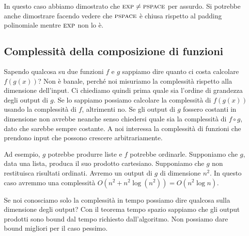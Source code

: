 In questo caso abbiamo dimostrato che $\textsc{exp} \not= \textsc{pspace}$ per assurdo. Si potrebbe anche dimostrare
facendo vedere che $\textsc{pspace}$ è chiusa rispetto al padding polinomiale mentre $\textsc{exp}$ non lo è.

\subsection{Complessità della composizione di funzioni}

Sapendo qualcosa su due funzioni $f$ e $g$ sappiamo dire quanto ci costa calcolare $f(g(x))$? Non è
banale, perché noi misuriamo la complessità rispetto alla dimensione dell'input. Ci chiediamo quindi
prima quale sia l'ordine di grandezza degli output di $g$. Se lo sappiamo possiamo calcolare la
complessità di $f(g(x))$ usando la complessità di $f$, altrimenti no. Se gli output di $g$ fossero
costanti in dimensione non avrebbe neanche senso chiedersi quale sia la complessità di $f \circ g$,
dato che sarebbe sempre costante. A noi interessa la complessità di funzioni che prendono input che
possono crescere arbitrariamente.

Ad esempio, $g$ potrebbe produrre liste e $f$ potrebbe ordinarle. Supponiamo che $g$, data una
lista, produca il suo prodotto cartesiano. Supponiamo che $g$ non restituisca risultati ordinati.
Avremo un output di $g$ di dimensione $n^{2}$. In questo caso avremmo una complessità $O(n^{2} +
n^{2}\log(n^{2})) = O(n^{2}\log{n})$.

Se noi conosciamo solo la complessità in tempo possiamo dire qualcosa sulla dimensione degli
output? Con il teorema tempo spazio sappiamo che gli output prodotti sono bound dal tempo richiesto
dall'algoritmo. Non possiamo dare bound migliori per il caso pessimo.

